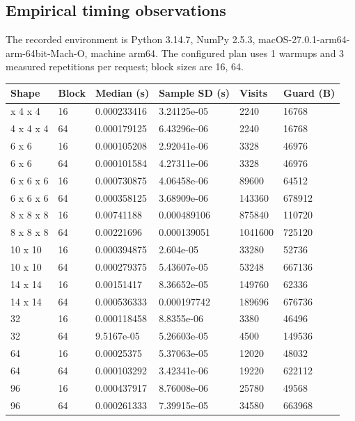 \documentclass[
  english,
  11pt,
]{article}
\newcounter{none} %
\begin{document}
\subsection{Empirical timing
observations}\label{empirical-timing-observations}

The recorded environment is Python 3.14.7, NumPy 2.5.3,
macOS-27.0.1-arm64-arm-64bit-Mach-O, machine arm64. The configured plan
uses 1 warmups and 3 measured repetitions per request; block sizes are
16, 64.

{\def\LTcaptype{none} %
\begin{longtable}[]{@{}llllll@{}}
\toprule\noalign{}
Shape & Block & Median (s) & Sample SD (s) & Visits & Guard (B) \\
\midrule\noalign{}
\endhead
\bottomrule\noalign{}
\endlastfoot
4 x 4 x 4 & 16 & 0.000233416 & 3.24125e-05 & 2240 & 16768 \\
4 x 4 x 4 & 64 & 0.000179125 & 6.43296e-06 & 2240 & 16768 \\
6 x 6 & 16 & 0.000105208 & 2.92041e-06 & 3328 & 46976 \\
6 x 6 & 64 & 0.000101584 & 4.27311e-06 & 3328 & 46976 \\
6 x 6 x 6 & 16 & 0.000730875 & 4.06458e-06 & 89600 & 64512 \\
6 x 6 x 6 & 64 & 0.000358125 & 3.68909e-06 & 143360 & 678912 \\
8 x 8 x 8 & 16 & 0.00741188 & 0.000489106 & 875840 & 110720 \\
8 x 8 x 8 & 64 & 0.00221696 & 0.000139051 & 1041600 & 725120 \\
10 x 10 & 16 & 0.000394875 & 2.604e-05 & 33280 & 52736 \\
10 x 10 & 64 & 0.000279375 & 5.43607e-05 & 53248 & 667136 \\
14 x 14 & 16 & 0.00151417 & 8.36652e-05 & 149760 & 62336 \\
14 x 14 & 64 & 0.000536333 & 0.000197742 & 189696 & 676736 \\
32 & 16 & 0.000118458 & 8.8355e-06 & 3380 & 46496 \\
32 & 64 & 9.5167e-05 & 5.26603e-05 & 4500 & 149536 \\
64 & 16 & 0.00025375 & 5.37063e-05 & 12020 & 48032 \\
64 & 64 & 0.000103292 & 3.42341e-06 & 19220 & 622112 \\
96 & 16 & 0.000437917 & 8.76008e-06 & 25780 & 49568 \\
96 & 64 & 0.000261333 & 7.39915e-05 & 34580 & 663968 \\
\end{longtable}
}
\end{document}
